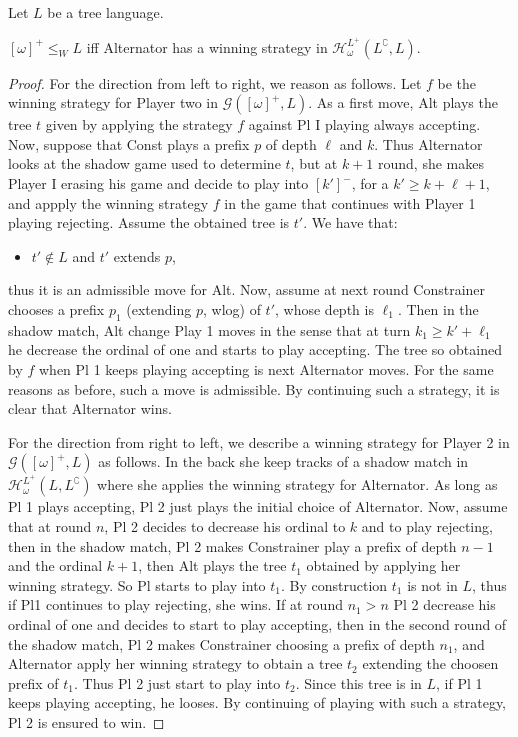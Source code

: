 \begin{proposition}\label{prop:omega} Let $L$ be a tree language.

$[\omega]^+ \leq_W L$ iff Alternator has a winning strategy in $\mathcal{H}^{L^+}_\omega(L^\complement, L)$. 

\end{proposition}
\begin{proof}
For the direction from left to right, we reason as follows. Let $f$ be the winning strategy for Player two in $\mathcal{G}([\omega]^+, L)$. As a first move, Alt plays the tree $t$ given by applying the strategy $f$ against Pl I playing always accepting. Now, suppose that Const plays a prefix $p$ of depth $\ell$ and $k$. Thus Alternator looks at the shadow game used to determine $t$, but at $k+1$ round, she makes Player I erasing his game and decide to play into $[k']^-$, for a $k' \geq k + \ell +1$, and appply the winning strategy $f$ in the game that continues with Player 1 playing rejecting. Assume the obtained tree is $t'$. We have that:
\begin{itemize}
\item $t' \notin L$ and $t'$ extends $p$,
\end{itemize}
thus it is an admissible move for Alt.
Now, assume at next round Constrainer chooses a prefix $p_1$ (extending $p$, wlog) of $t'$, whose depth is $\ell_1$. Then in the shadow match, Alt change Play 1 moves in the sense that at turn $k_1 \geq k' + \ell_1$ he decrease the ordinal of one and starts to play accepting. The tree so obtained by $f$ when Pl 1 keeps playing accepting is next Alternator moves. For the same reasons as before, such a move is admissible. By continuing such a strategy, it is clear that Alternator wins.

For the direction from right to left, we describe a winning strategy for Player 2 in $\mathcal{G}([\omega]^+, L)$ as follows. In the back she keep tracks of a shadow match in $\mathcal{H}^{L^+}_\omega(L, L^\complement)$ where she applies the  winning strategy for Alternator. 
As long as Pl 1 plays accepting, Pl 2 just plays the initial choice of Alternator. Now, assume that at round $n$, Pl 2 decides to decrease his ordinal to $k$ and to play rejecting, then in the shadow match, Pl 2 makes Constrainer play a prefix of depth $n-1$ and the ordinal $k+1$, then Alt plays the tree $t_1$ obtained by applying her winning strategy. So Pl starts to play into $t_1$. By construction $t_1$ is not in $L$, thus if Pl1 continues to play rejecting, she wins. If at round $n_1> n$ Pl 2 decrease his ordinal of one and decides to start to play accepting, then in the second round of the shadow match, Pl 2 makes Constrainer choosing a prefix of depth $n_1$, and Alternator apply her winning strategy to obtain a tree $t_2$ extending the choosen prefix of $t_1$. Thus Pl 2 just start to play into $t_2$. Since this tree is in $L$, if Pl 1 keeps playing accepting, he looses. By continuing of playing with such a strategy, Pl 2 is ensured to win. 
\end{proof}

